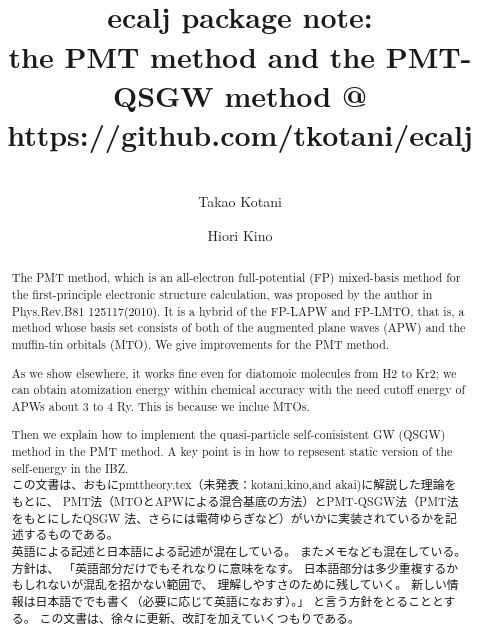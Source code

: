 \documentclass[a4paper,10pt,aip,onecolumn,amsmath,amssymb,floatfix,rmp]{revtex4-1}
\begin{document}
\title{{\Huge \ \\ ecalj package note:}\\ the PMT method and the
PMT-QSGW method  @ https://github.com/tkotani/ecalj}
\author{\large \ \\ Takao Kotani}
\author{\large Hiori Kino}
\vspace{1cm}
\begin{abstract}
The PMT method, which is an all-electron full-potential (FP) mixed-basis
method for the first-principle electronic structure calculation, was proposed 
by the author in Phys.Rev.B81 125117(2010). 
It is a hybrid of the FP-LAPW and FP-LMTO, that is, a method 
whose basis set consists of both of the augmented plane waves (APW) 
and the muffin-tin orbitals (MTO). We give improvements for the PMT
method. 

 As we show elsewhere, it works fine even for diatomoic molecules
from H2 to Kr2; we can obtain atomization energy within chemical
accuracy with the need cutoff energy of APWs about 3 to 4 Ry. This is
because we inclue MTOs.

Then we explain how to implement the quasi-particle
self-conisistent GW (QSGW) method in the PMT method.
A key point is in how to repsesent static version of the self-energy 
in the IBZ.\\
 
この文書は、おもにpmttheory.tex（未発表：kotani,kino,and akai)に解説した理論をもとに、
PMT法（MTOとAPWによる混合基底の方法）とPMT-QSGW法（PMT法をもとにしたQSGW
法、さらには電荷ゆらぎなど）がいかに実装されているかを記述するものである。\\

英語による記述と日本語による記述が混在している。
またメモなども混在している。方針は、
「英語部分だけでもそれなりに意味をなす。
日本語部分は多少重複するかもしれないが混乱を招かない範囲で、
理解しやすさのために残していく。
新しい情報は日本語ででも書く（必要に応じて英語になおす）。」
と言う方針をとることとする。
この文書は、徐々に更新、改訂を加えていくつもりである。

\end{abstract}
\maketitle
\tableofcontents
\end{document}
